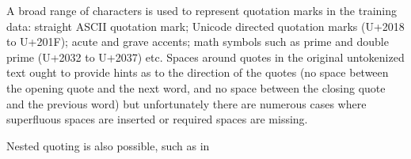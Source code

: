 \documentclass[11pt,letterpaper]{article}
\begin{document}
\begin{comment}
< Portugal ' s three Presidencies can best be summed up as ' ambitious on the Community ' s behalf ' , for on each occasion Portugal has tackled vital contemporary issues - the Lisbon Strategy , fo
r example , or the EU ' s relations with Africa and with South America .
---
> Portugal ' s three Presidencies can best be summed up as “ ambitious on the Community ' s behalf ” , for on each occasion Portugal has tackled vital contemporary issues - the Lisbon Strategy , fo
r example , or the EU ' s relations with Africa and with South America .
4308c4310

Spanish directed ? and !

mezery kolem někdy jsou, někdy ne
pravidla pro pořadí (tečka a uvozovka) se liší jazyk od jazyka a situace od situace

gdiff.pl europarl-v6.de-en/en.orig.gz europarl-v6b.de-en/en.orig.gz | less

< " The Commission ' s internal control " he said " is not forceful enough in preventing incorrect operation .
> “ The Commission ' s internal control ” he said “ is not forceful enough in preventing incorrect operation .

gdiff.pl europarl-v6.de-en/en.orig.gz europarl-v6b.de-en/en.orig.gz | grep -P '“[^“”]*“[^“”]*”[^“”]*”'

< As the Wise Men ' s Report also says , and I quote : ' It is elementary ' common sense ' that the Commission should have supported the Parliament ' s decision - making process . '
> As the Wise Men ' s Report also says , and I quote : “ It is elementary “ common sense ” that the Commission should have supported the Parliament ' s decision - making process . ”
\end{comment}

A broad range of characters is used to represent quotation marks in the training data:
straight ASCII quotation mark; Unicode directed quotation marks (U+2018 to U+201F);
acute and grave accents; math symbols such as prime and double prime (U+2032 to U+2037)
etc. Spaces around quotes in the original untokenized text ought to provide hints as to the
direction of the quotes (no space between the opening quote and the next word, and
no space between the closing quote and the previous word) but unfortunately there are
numerous cases where superfluous spaces are inserted or required spaces are missing.

Nested quoting is also possible, such as in
\end{document}

